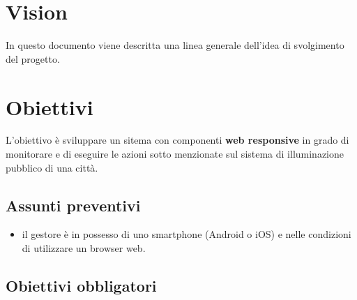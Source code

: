 \hypertarget{vision}{%
\section{Vision}\label{vision}}

In questo documento viene descritta una linea generale dell'idea di
svolgimento del progetto.

\hypertarget{obiettivi}{%
\section{Obiettivi}\label{obiettivi}}

L'obiettivo è sviluppare un sitema con componenti \textbf{web
responsive} in grado di monitorare e di eseguire le azioni sotto
menzionate sul sistema di illuminazione pubblico di una città.

\hypertarget{assunti-preventivi}{%
\subsection{Assunti preventivi}\label{assunti-preventivi}}

\begin{itemize}
\tightlist
\item
  il gestore è in possesso di uno smartphone (Android o iOS) e nelle
  condizioni di utilizzare un browser web.
\end{itemize}

\hypertarget{obiettivi-obbligatori}{%
\subsection{Obiettivi obbligatori}\label{obiettivi-obbligatori}}

